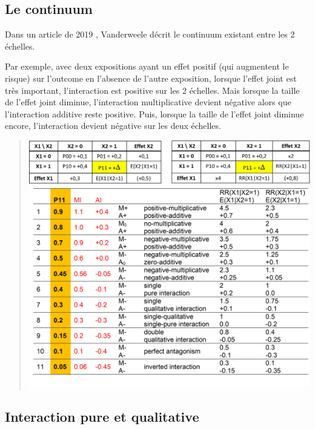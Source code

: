 \documentclass[
]{book}
\begin{document}
\hypertarget{le-continuum}{%
\subsection*{Le continuum}\label{le-continuum}}

Dans un article de 2019 \citet{vanderweele_interaction_2019}, Vanderweele décrit le continuum existant entre les 2 échelles.

Par exemple, avec deux expositions ayant un effet positif (qui augmentent le risque) sur l'outcome en l'absence de l'autre exposition, lorsque l'effet joint est très important, l'interaction est positive sur les 2 échelles. Mais lorsque la taille de l'effet joint diminue, l'interaction multiplicative devient négative alors que l'interaction additive reste positive. Puis, lorsque la taille de l'effet joint diminue encore, l'interaction devient négative sur les deux échelles.

\begin{quote}
\includegraphics[width=1\textwidth,height=\textheight]{img/Image6.png}
\includegraphics[width=1\textwidth,height=\textheight]{img/Image7.png}
\end{quote}

\hypertarget{interaction-pure-et-qualitative}{%
\subsection*{Interaction pure et qualitative}\label{interaction-pure-et-qualitative}}
\end{document}
